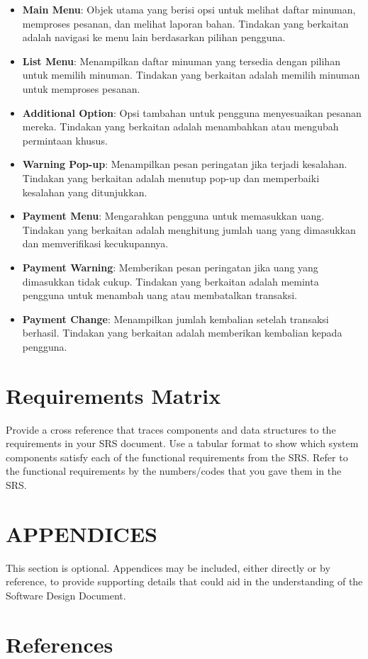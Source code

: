 \documentclass[12pt]{article}
\begin{document}
\begin{itemize}
    \item \textbf{Main Menu}: Objek utama yang berisi opsi untuk melihat daftar minuman, memproses pesanan, dan melihat laporan bahan. Tindakan yang berkaitan adalah navigasi ke menu lain berdasarkan pilihan pengguna.
    \item \textbf{List Menu}: Menampilkan daftar minuman yang tersedia dengan pilihan untuk memilih minuman. Tindakan yang berkaitan adalah memilih minuman untuk memproses pesanan.
    \item \textbf{Additional Option}: Opsi tambahan untuk pengguna menyesuaikan pesanan mereka. Tindakan yang berkaitan adalah menambahkan atau mengubah permintaan khusus.
    \item \textbf{Warning Pop-up}: Menampilkan pesan peringatan jika terjadi kesalahan. Tindakan yang berkaitan adalah menutup pop-up dan memperbaiki kesalahan yang ditunjukkan.
    \item \textbf{Payment Menu}: Mengarahkan pengguna untuk memasukkan uang. Tindakan yang berkaitan adalah menghitung jumlah uang yang dimasukkan dan memverifikasi kecukupannya.
    \item \textbf{Payment Warning}: Memberikan pesan peringatan jika uang yang dimasukkan tidak cukup. Tindakan yang berkaitan adalah meminta pengguna untuk menambah uang atau membatalkan transaksi.
    \item \textbf{Payment Change}: Menampilkan jumlah kembalian setelah transaksi berhasil. Tindakan yang berkaitan adalah memberikan kembalian kepada pengguna.
\end{itemize}

\section{Requirements Matrix}
Provide a cross reference that traces components and data structures to the requirements in your
SRS document.
Use  a  tabular  format to show  which system  components satisfy each of the  functional 
requirements from the SRS. Refer to the functional requirements by the numbers/codes that you 
gave them in the SRS.


\section{APPENDICES}
This section is optional.
Appendices may be included, either directly or by reference, to provide supporting details that could 
aid in the understanding of the Software Design Document.

\section {References}



\end{document}
